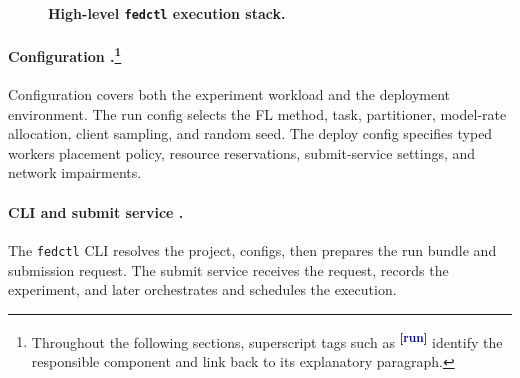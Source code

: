 \begin{figure}[!htbp]
\caption{\textbf{High-level \texttt{fedctl} execution stack.}}
\label{fig:fedctl_overview}
\end{figure}

\hypertarget{implcomp:run}{}\hypertarget{implcomp:dep}{}
\paragraph[Configuration.]{Configuration .\footnote{Throughout the following sections, superscript tags such as \textsuperscript{\textbf{\textcolor{darkblue}{[run]}}} identify the responsible component and link back to its explanatory paragraph.}}
Configuration covers both the experiment workload and the deployment environment. The run config selects the FL method, task, partitioner, model-rate allocation, client sampling, and random seed. The deploy config specifies typed workers placement policy, resource reservations, submit-service settings, and network impairments.

\hypertarget{implcomp:request}{}
\paragraph[CLI and submit service.]{CLI and submit service .}
The \texttt{fedctl} CLI resolves the project, configs, then prepares the run bundle and submission request. The submit service receives the request, records the experiment, and later orchestrates and schedules the execution.

